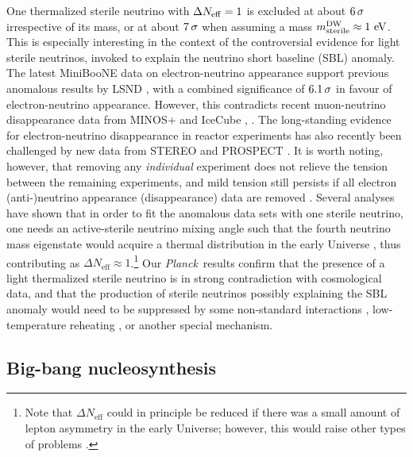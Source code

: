 \documentclass[longauth,traditabstract]{aa}
\def\Planck{\textit{Planck}}
\def\,{\thinspace}
\newcommand{\nnu}{N_{\rm eff}}
\providecommand{\text}[1]{\rm{#1}}
\newcommand{\eV}{\,\text{eV}}
\begin{document}
One thermalized sterile neutrino with $\Delta \nnu=1$ is excluded at about
$6\,\sigma$ irrespective of its mass, or at about $7\,\sigma$ when
assuming a mass $m_\mathrm{sterile}^\mathrm{DW} \approx 1\,\eV$.
This is especially interesting in the context of the controversial evidence for
light sterile neutrinos, invoked to explain the neutrino short baseline
(SBL) anomaly.
The latest MiniBooNE data on electron-neutrino appearance \citep{Aguilar-Arevalo:2018gpe} support previous anomalous results by LSND \citep{Aguilar:2001ty}, with a combined significance of $6.1\,\sigma$ in favour of electron-neutrino appearance.
However, this contradicts recent muon-neutrino
disappearance data from MINOS+ and IceCube \citep{Dentler:2018sju}, . The
long-standing evidence for electron-neutrino disappearance in reactor
experiments has also recently been challenged by new data from STEREO
\citep{Almazan:2018wln} and PROSPECT \citep{Ashenfelter:2018iov}. It is worth
noting, however, that removing any \emph{individual} experiment does not relieve
the tension between the remaining experiments, and mild tension still persists
if all electron (anti-)neutrino appearance (disappearance) data are removed
\citep[see][for a detailed summary]{MaltoniTalk}.
Several analyses have shown that in order to fit the anomalous data sets with one sterile neutrino, one needs an active-sterile neutrino mixing angle such that the fourth neutrino mass eigenstate would acquire a thermal distribution in the early Universe \citep[see e.g.,][]{Hannestad13,Bridle17,Knee18}, thus contributing as $\Delta N_\mathrm{eff} \approx 1$.\,\footnote{Note that $\Delta N_\mathrm{eff}$ could in principle be reduced if there was a small amount of lepton asymmetry in the early Universe; however, this would raise other types of problems \citep{Saviano:2013ktj}.} Our
\Planck\ results confirm that the presence of a light thermalized sterile
neutrino is in strong contradiction with cosmological data, and that the
production of sterile neutrinos possibly explaining the SBL anomaly would need to be suppressed by some
non-standard interactions \citep{Archidiacono:2016kkh,Chu:2015ipa},
low-temperature reheating \citep{deSalas:2015glj}, or another special mechanism.

\subsection{Big-bang nucleosynthesis}\label{sec:BBN}
\end{document}
